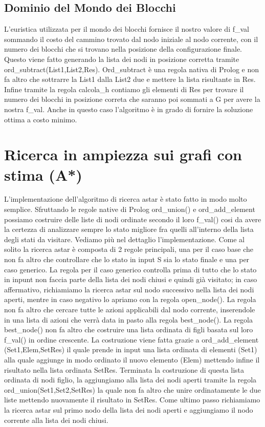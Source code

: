 \subsection{Dominio del Mondo dei Blocchi}

L'euristica utilizzata per il mondo dei blocchi fornisce il nostro valore di f_val sommando il costo del cammino trovato dal nodo iniziale al nodo corrente, con il numero dei blocchi che si trovano nella posizione della configurazione finale. Questo viene fatto generando la lista dei nodi in posizione corretta tramite ord_subtract(List1,List2,Res). Ord_subtract è una regola nativa di Prolog e non fa altro che sottrarre la List1 dalla List2 due e mettere la lista risultante in Res. Infine tramite la regola calcola_h contiamo gli elementi di Res per trovare il numero dei blocchi in posizione correta che saranno poi sommati a G per avere la nostra f_val. Anche in questo caso l'algoritmo è in grado di fornire la soluzione ottima a costo minimo.


\section{Ricerca in ampiezza sui grafi con stima (A*)}

L'implementazione dell'algoritmo di ricerca astar è stato fatto in modo molto semplice. Sfruttando le regole native di Prolog ord_union() e ord_add_element possiamo costruire delle liste di nodi ordinate secondo il loro f_val() cosi da avere la certezza di analizzare sempre lo stato migliore fra quelli all'interno della lista degli stati da visitare. Vediamo più nel dettaglio l'implementazione. Come al solito la ricerca astar è composta di 2 regole principali, una per il caso base che non fa altro che controllare che lo stato in input S sia lo stato finale e una per caso generico. La regola per il caso generico controlla prima di tutto che lo stato in inpunt non faccia parte della lista dei nodi chiusi e quindi già visitato; in caso affermativo, richiamiamo la ricerca astar sul nodo successivo nella lista dei nodi aperti, mentre in caso negativo lo apriamo con la regola open_node(). La regola non fa altro che cercare tutte le azioni applicabili dal nodo corrente, inserendole in una lista di azioni che verrà data in pasto alla regola best_node(). La regola best_node() non fa altro che costruire una lista ordinata di figli basata sul loro f_val() in ordine crescente. La costruzione viene fatta grazie a ord_add_element (Set1,Elem,SetRes) il quale prende in input una lista ordinata di elementi (Set1) alla quale aggiunge in modo ordinato il nuovo elemento (Elem) mettendo infine il risultato nella lista ordinata SetRes. Terminata la costruzione di questa lista ordinata di nodi figlio, la aggiungiamo alla lista dei nodi aperti tramite la regola ord_union(Set1,Set2,SetRes) la quale non fa altro che unire ordinatamente le due liste mettendo nuovamente il risultato in SetRes. Come ultimo passo richiamiamo la ricerca astar sul primo nodo della lista dei nodi aperti e aggiungiamo il nodo corrente alla lista dei nodi chiusi.

